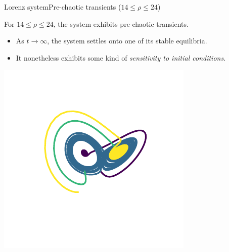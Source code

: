\documentclass[usenames,dvipsnames,svgnames,10pt,aspectratio=169]{beamer}
\begin{document}
\begin{frame}[t, c]{Lorenz system}{Pre-chaotic transients ($14 \leq \rho \leq 24$)}
	\begin{minipage}{.48\textwidth}
		For $14 \leq \rho \leq 24$, the system exhibits pre-chaotic transients.
		\begin{itemize}
			\item As $t \to \infty$, the system settles onto one of its stable equilibria.

			\bigskip

			\item It nonetheless exhibits some kind of \emph{sensitivity to initial conditions}.
		\end{itemize}
	\end{minipage}%
	\hfill
	\begin{minipage}{.48\textwidth}
		\centering
		\includegraphics[width=.8\textwidth]{chaotic_transients_phase_space}
	\end{minipage}

	\vspace{1.5cm}
\end{frame}
\end{document}
